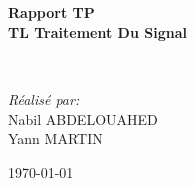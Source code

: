 \begin{titlepage}
\begin{center}




\textsc{\Large }\\[0.5cm]

\HRule \\[0.4cm]

{\huge \bfseries Rapport TP \\[0.4cm]
TL Traitement Du Signal \\[0.4cm] }

\HRule \\[4cm]

\begin{minipage}{0.7\textwidth}
  \begin{center} %
    \LARGE
    \emph{Réalisé par:}\\
    Nabil \textsc{ABDELOUAHED}\\
    Yann \textsc{MARTIN}\\
  \end{center}
\end{minipage}
\begin{minipage}{0.4\textwidth}
  \begin{flushright} \large
  \end{flushright}
\end{minipage}
\vfill



{\large \today}

\end{center}
\end{titlepage}
